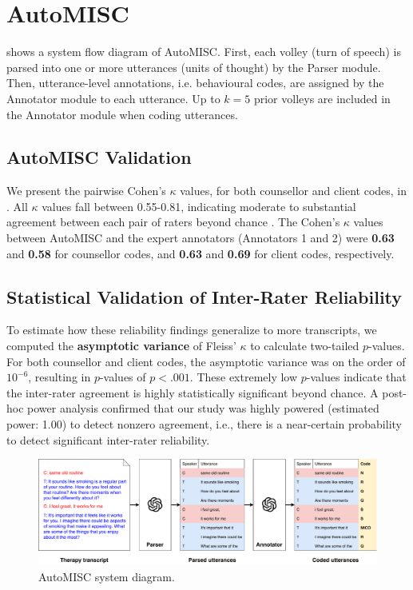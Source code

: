 \chapter{AutoMISC}
\label{app:automisc}


 shows a system flow diagram of AutoMISC. First, each volley (turn of speech) is parsed into one or more utterances (units of thought) by the Parser module. Then, utterance-level annotations, i.e. behavioural codes, are assigned by the Annotator module to each utterance. Up to $k=5$ prior volleys are included in the Annotator module when coding utterances.



\section*{AutoMISC Validation}
\label{appendix:automisc_val}


We present the pairwise Cohen's $\kappa$ values, for both counsellor and client codes, in . All $\kappa$ values fall between 0.55-0.81, indicating moderate to substantial agreement between each pair of raters beyond chance \cite{cohenrange}. The Cohen's $\kappa$ values between AutoMISC and the expert annotators (Annotators 1 and 2) were \textbf{0.63} and \textbf{0.58} for counsellor codes, and \textbf{0.63} and \textbf{0.69} for client codes, respectively. 

\section*{Statistical Validation of Inter-Rater Reliability}
To estimate how these reliability findings generalize to more transcripts, we computed the \textbf{asymptotic variance} of Fleiss' $\kappa$ to calculate two-tailed $p$-values. For both counsellor and client codes, the asymptotic variance was on the order of $10^{-6}$, resulting in $p$-values of $p<.001$. These extremely low $p$-values indicate that the inter-rater agreement is highly statistically significant beyond chance. A post-hoc power analysis confirmed that our study was highly powered (estimated power: 1.00) to detect nonzero agreement, i.e., there is a near-certain probability to detect significant inter-rater reliability.

\begin{figure}[!ht]
    \centering
    \includegraphics[width=\linewidth]{fig/automisc.pdf}
    \caption{AutoMISC system diagram.}
    \label{fig:automisc}
\end{figure}

